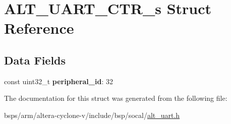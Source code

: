 \hypertarget{structALT__UART__CTR__s}{}\section{A\+L\+T\+\_\+\+U\+A\+R\+T\+\_\+\+C\+T\+R\+\_\+s Struct Reference}
\label{structALT__UART__CTR__s}
\subsection*{Data Fields}
\begin{DoxyCompactItemize}
\item 
\mbox{\label{structALT__UART__CTR__s_a08c18f9be5b9d2b9a14c61047edc7be7}} 
const uint32\+\_\+t {\bfseries peripheral\+\_\+id}\+: 32
\end{DoxyCompactItemize}


The documentation for this struct was generated from the following file\+:\begin{DoxyCompactItemize}
\item 
bsps/arm/altera-\/cyclone-\/v/include/bsp/socal/\mbox{\hyperlink{alt__uart_8h}{alt\+\_\+uart.\+h}}\end{DoxyCompactItemize}
